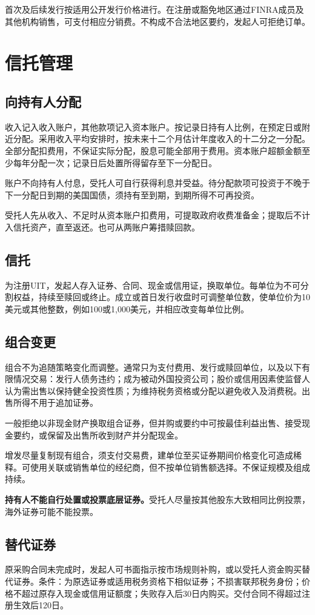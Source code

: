 \documentclass[UTF8,fontset=none,11pt,a4paper]{ctexart}
\begin{document}
首次及后续发行按适用公开发行价格进行。在注册或豁免地区通过FINRA成员及其他机构销售，可支付相应分销费。不构成不合法地区要约，发起人可拒绝订单。


\section*{信托管理}
\subsection*{向持有人分配}
收入记入收入账户，其他款项记入资本账户。按记录日持有人比例，在预定日或附近分配。采用收入平均安排时，按未来十二个月估计年度收入的十二分之一分配。全部分配扣费用，不保证实际分配，股息可能全部用于费用。资本账户超额金额至少每年分配一次；记录日后处置所得留存至下一分配日。


账户不向持有人付息，受托人可自行获得利息并受益。待分配款项可投资于不晚于下一分配日到期的美国国债，须持有至到期，到期所得不可再投资。


受托人先从收入、不足时从资本账户扣费用，可提取政府收费准备金；提取后不计入信托资产，直至返还。也可从两账户筹措赎回款。


\subsection*{信托}
为注册UIT，发起人存入证券、合同、现金或信用证，换取单位。每单位为不可分割权益，持续至赎回或终止。成立或首日发行收盘时可调整单位数，使单位价为10美元或其他整数，例如100或1,000美元，并相应改变每单位比例。


\subsection*{组合变更}
组合不为追随策略变化而调整。通常只为支付费用、发行或赎回单位，以及以下有限情况交易：发行人债务违约；成为被动外国投资公司；股价或信用因素使监督人认为需出售以保持健全投资性质；为维持税务资格或分配以避免收入及消费税。出售所得不用于追加证券。


一般拒绝以非现金财产换取组合证券，但并购或要约中可按最佳利益出售、接受现金要约，或保留及出售所收到财产并分配现金。


增发尽量复制现有组合，须支付交易费，建单位至买证券期间价格变化可造成稀释。可使用关联或销售单位的经纪商，但不按单位销售额选择。不保证规模及组成持续。


\textbf{持有人不能自行处置或投票底层证券。}受托人尽量按其他股东大致相同比例投票，海外证券可能不能投票。


\subsection*{替代证券}
原采购合同未完成时，发起人可书面指示按市场规则补购，或以受托人资金购买替代证券。条件：为原选证券或适用税务资格下相似证券；不损害联邦税务身份；价格不超过原存入现金或信用证额度；失败存入后30日内购买。交付合同不得超过注册生效后120日。
\end{document}
